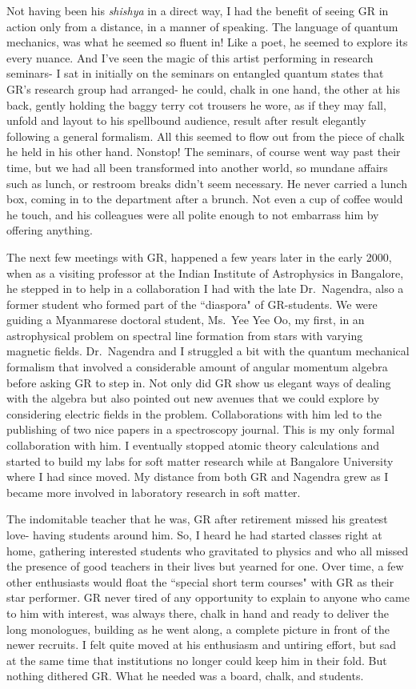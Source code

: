 Not having been his \textit{shishya} in a direct way, I had the benefit of seeing GR in action only from a distance, in a manner of speaking. The language of quantum mechanics, was what he seemed so fluent in! Like a poet, he seemed to explore its every nuance. And I've seen the magic of this artist performing in research seminars- I sat in initially on the seminars on entangled quantum states that GR's research group had arranged- he could, chalk in one hand, the other at his back, gently holding the baggy terry cot trousers he wore, as if they may fall, unfold and layout to his spellbound audience, result after result elegantly following a general formalism. All this seemed to flow out from the piece of chalk he held in his other hand. Nonstop!  The seminars, of course went way past their time, but we had all been transformed into another world, so mundane affairs such as lunch, or restroom breaks didn't seem necessary. He never carried a lunch box, coming in to the department after a brunch. Not even a cup of coffee would he touch, and his colleagues were all polite enough to not embarrass him by offering anything. 

The next few meetings with GR, happened a few years later in the early 2000, when as a visiting professor at the Indian Institute of Astrophysics in Bangalore, he stepped in to help in a collaboration I had with the late Dr.\ Nagendra, also a former student who formed part of the ``diaspora" of GR-students. We were guiding a Myanmarese doctoral student, Ms.\ Yee Yee Oo, my first, in an astrophysical problem on spectral line formation from stars with varying magnetic fields. Dr.\ Nagendra and I struggled a bit with the quantum mechanical formalism that involved a considerable amount of angular momentum algebra before asking GR to step in. Not only did GR show us elegant ways of dealing with the algebra but also pointed out new avenues that we could explore by considering electric fields in the problem. Collaborations with him led to the publishing of two nice papers in a spectroscopy journal. This is my only formal collaboration with him. I eventually stopped atomic theory calculations and started to build my labs for soft matter research while at Bangalore University where I had since moved. My distance from both GR and Nagendra grew as I became more involved in laboratory research in soft matter. 

The indomitable teacher that he was, GR after retirement missed his greatest love- having students around him. So, I heard he had started classes right at home, gathering interested students who gravitated to physics and who all missed the presence of good teachers in their lives but yearned for one. Over time, a few other enthusiasts would float the ``special short term courses" with GR as their star performer. GR never tired of any opportunity to explain to anyone who came to him with interest, was always there, chalk in hand and ready to deliver the long monologues, building as he went along, a complete picture in front of the newer recruits. I felt quite moved at his enthusiasm and untiring effort, but sad at the same time that institutions no longer could keep him in their fold. But nothing dithered GR. What he needed was a board, chalk, and students.


